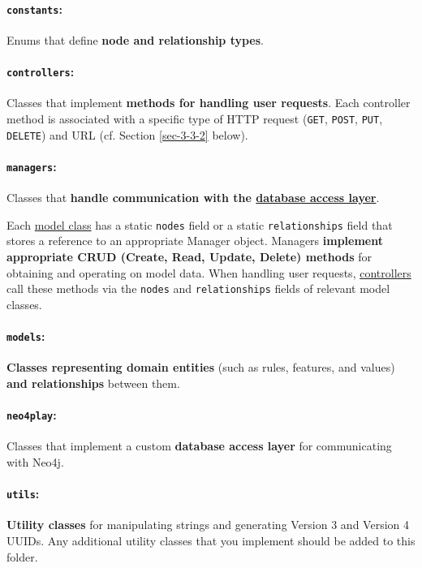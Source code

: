 \documentclass[11pt]{article}
\begin{document}
\paragraph{\texttt{constants}:}
\label{sec-3-3-1-1}
Enums that define \textbf{node and relationship types}.

\paragraph{\texttt{controllers}:}
\label{sec-3-3-1-2}
Classes that implement \textbf{methods for handling user requests}. Each
controller method is associated with a specific type of HTTP
request (\texttt{GET}, \texttt{POST}, \texttt{PUT}, \texttt{DELETE}) and URL (cf. Section
\ref{sec-3-3-2} below).

\paragraph{\texttt{managers}:}
\label{sec-3-3-1-3}
Classes that \textbf{handle communication with the \hyperref[sec-3-3-1-5]{database access
layer}}.

Each \hyperref[sec-3-3-1-4]{model class} has a static \texttt{nodes} field or a static
\texttt{relationships} field that stores a reference to an appropriate
Manager object. Managers \textbf{implement appropriate CRUD (Create,
Read, Update, Delete) methods} for obtaining and operating on
model data. When handling user requests, \hyperref[sec-3-3-1-2]{controllers} call these
methods via the \texttt{nodes} and \texttt{relationships} fields of relevant
model classes.

\paragraph{\texttt{models}:}
\label{sec-3-3-1-4}
\textbf{Classes representing domain entities} (such as rules, features,
and values) \textbf{and relationships} between them.

\paragraph{\texttt{neo4play}:}
\label{sec-3-3-1-5}
Classes that implement a custom \textbf{database access layer} for
communicating with Neo4j.

\paragraph{\texttt{utils}:}
\label{sec-3-3-1-6}
\textbf{Utility classes} for manipulating strings and generating Version
3 and Version 4 UUIDs. Any additional utility classes that you
implement should be added to this folder.
\end{document}
